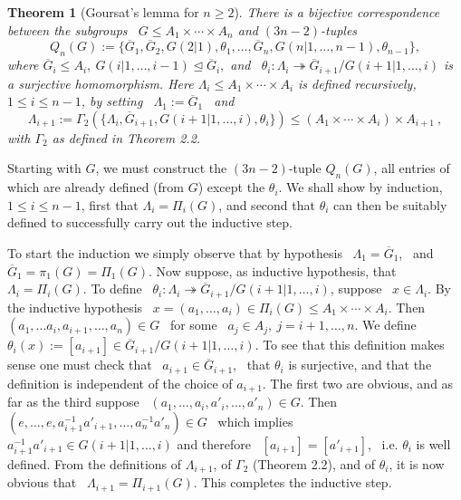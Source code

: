 \documentclass[11pt]{article}
\theoremstyle{change}
\newtheorem{Thm}{Theorem}[section]
\newcommand{\<}{\langle}
\renewcommand{\>}{\rangle}
\newcommand{\Proof} {\noindent{\itshape Proof.\quad }}
\begin{document}
\begin{Thm}[Goursat's lemma for $n \geq 2$]\label{3.2}
There is a bijective correspondence between the subgroups \ $G \leq A_1 \times \cdots\times A_n$ and $(3n-2)$-tuples 
$$Q_n(G) :=    \{\overline{G}_1,\overline{G}_2, G(2|1), \theta_1,
\ldots, \overline{G}_n, G(n|1,\ldots ,n-1), \theta_{n-1}  \} , $$
where $\overline{G}_i \leq A_i, \ G(i|1,\ldots,i-1)\unlhd \overline{G}_i,   $ and
\ $\theta_i : \Lambda_i \twoheadrightarrow \overline{G}_{i+1}/G(i+1|1,\ldots,i)$ is a surjective
homomorphism. Here
$\Lambda_i \leq A_1\times \cdots\times A_i$ is defined recursively, $1 \leq i \leq n-1$, by setting \ $\Lambda_1  := \overline{G}_1$ \ and 
 $$\Lambda_{i+1} := \Gamma_2(\{ \Lambda_i, \overline{G}_{i+1}, G(i+1|1,\ldots ,i), \theta_i \}) \leq
 (A_1\times \cdots \times A_i)\times A_{i+1} \ ,$$
 with  $\Gamma_2$ as defined in Theorem 2.2.  
 \end{Thm}
 
\Proof
Starting with $G$, we must construct the $(3n-2)$-tuple $Q_{n}(G)$, all entries of which are already
defined (from $G$) except the $\theta_i$. We shall show by induction, $1\leq i \leq n-1$, first that $\Lambda_i
 = \Pi_i(G)$, and second that $\theta_i$ can then be suitably defined to successfully carry out
 the inductive step.
 
 To start the induction we simply observe that by hypothesis \  $\Lambda_1 = \overline{G}_1$,
 \ and \ $\overline{G}_1 = \pi_1(G) = \Pi_1(G)$. Now suppose, as inductive
hypothesis, that \ $\Lambda_i = \Pi_i(G)$. To define \ $\theta_i : \Lambda_i \twoheadrightarrow \overline{G}_{i+1}/G(i+1|1,\ldots,i)$, suppose \ $x \in \Lambda_i$. By the
inductive hypothesis \ $x = (a_1,\ldots ,a_i) \in 
\Pi_i(G) \leq A_1\times \cdots \times A_i$. Then \ $(a_1,\ldots a_i, a_{i+1}, 
\ldots, a_n) \in G$ \ for some \ $a_j \in A_j, \ j = i+1,\ldots, n$. We define
\ $\theta_i(x) := [a_{i+1}] \in \overline{G}_{i+1}/G(i+1|1,\ldots,i)$. To see
that this definition makes sense one must check that \ $a_{i+1}\in 
\overline{G}_{i+1}$, \ that $\theta_i$ is surjective, and that the definition is
independent of the choice of $a_{i+1}$. The first two are obvious, and as far as
the third suppose \ $(a_1,\ldots,a_i,a'_i,\ldots,a'_n)\in G$. Then \ 
$(e,\ldots,e,a_{i+1}^{-1}a'_{i+1},\ldots,a_n^{-1}a'_n) \in G$ \ which implies
\ $a_{i+1}^{-1}a'_{i+1} \in  G(i+1|1,\ldots,i)$ and therefore \ $[a_{i+1}]
 = [a'_{i+1}]$, \ i.e. $\theta_i$ is well defined. From the definitions of 
$\Lambda_{i+1}$, 
of $\Gamma_2$  (Theorem 2.2), and of $\theta_i$,  it 
is now obvious that \  $\Lambda_{i+1} = \Pi_{i+1}(G)$. This completes the 
inductive step.
\end{document}
